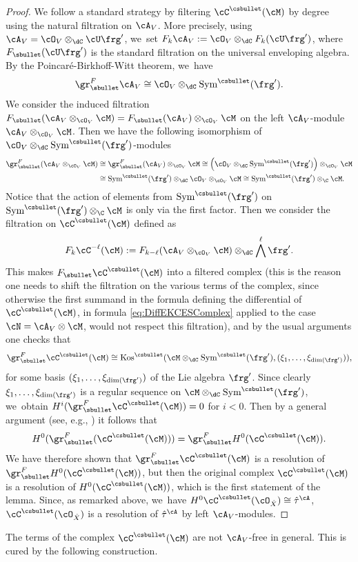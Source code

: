 \begin{proof}
We follow a standard strategy by filtering
$\cC^{\csbullet}(\cM)$ by degree using the natural
filtration on $\cA_V$. More precisely, using
$\cA_V=\cO_V\otimes_\dC\cU\frg'$, we~set $F_k\cA_V:=\cO_V\otimes_\dC F_k(\cU\frg')$, where $F_\sbullet(\cU\frg')$ is the standard filtration on the universal enveloping algebra. By the Poincaré-Birkhoff-Witt theorem, we~have
\[
\gr^F_\sbullet \cA_V \cong \cO_V\otimes_\dC \textup{Sym}^{\csbullet}(\frg').
\]
We consider the induced filtration
$F_\sbullet(\cA_V \otimes_{\cO_V} \cM) = F_\sbullet(\cA_V) \otimes_{\cO_V} \cM$ on the left $\cA_V$\nobreakdash-mod\-ule
$\cA_V \otimes_{\cO_V} \cM$. Then we have the following isomorphism of $\cO_V\otimes_\dC \textup{Sym}^{\csbullet}(\frg')$\nobreakdash-mod\-ules
\begin{align*}
\gr^F_\sbullet(\cA_V \otimes_{\cO_V} \cM) &\cong \gr^F_\sbullet(\cA_V) \otimes_{\cO_V} \cM
\cong
\left(\cO_V\otimes_\dC \textup{Sym}^{\csbullet}(\frg')\right) \otimes_{\cO_V} \cM
\\ &\cong
\textup{Sym}^{\csbullet}(\frg') \otimes_{\dC} \cO_V \otimes_{\cO_V} \cM
\cong
\textup{Sym}^{\csbullet}(\frg') \otimes_{\C} \cM.
\end{align*}
Notice that the action of elements from $\textup{Sym}^{\csbullet}(\frg')$ on
$\textup{Sym}^{\csbullet}(\frg') \otimes_{\C} \cM$ is only via the first factor.
Then we consider the filtration on $\cC^{\csbullet}(\cM)$ defined as
\[
F_k \cC^{-\ell}(\cM) :=
F_{k-\ell}(\cA_V \otimes_{\cO_V} \cM) \otimes_\dC \bigwedge^\ell \frg'.
\]
This makes $F_\sbullet\cC^{\csbullet}(\cM)$ into a filtered complex (this is the reason one needs to shift the filtration on the various terms of the complex, since otherwise the first summand in the formula defining the differential of $\cC^{\csbullet}(\cM)$, \ie in formula \eqref{eq:DiffEKCESComplex} applied to the case $\cN=\cA_V\otimes \cM$, would not respect this filtration), and by the usual arguments one checks that
\[
\gr^F_\sbullet \cC^{\csbullet}(\cM)
\cong \textup{Kos}^{\csbullet}(\cM \otimes_\dC \textup{Sym}^{\csbullet}(\frg'), (\xi_1,\ldots,\xi_{\dim(\frg')})),
\]
for some basis $(\xi_1,\ldots,\xi_{\dim(\frg')})$ of the Lie algebra $\frg'$. Since clearly
$\xi_1,\ldots,\xi_{\dim(\frg')}$ is a regular sequence on $\cM\otimes_\dC \textup{Sym}^{\csbullet}(\frg')$, we~obtain $H^i(\gr_\sbullet^F \cC^{\csbullet}(\cM)) = 0$ for $i<0$. Then by a general argument (see, e.g., \cite[Th.\,4.3.5]{SST}) it follows that
\[
H^0(\gr^F_\sbullet(\cC^{\csbullet}(\cM)))=\gr^F_\sbullet H^0(\cC^{\csbullet}(\cM)).
\]
We have therefore shown that $\gr^F_\sbullet \cC^{\csbullet}(\cM)$ is a resolution of
$\gr^F_\sbullet H^0(\cC^{\csbullet}(\cM))$, but then
the original complex $\cC^{\csbullet}(\cM)$ is a resolution of $H^0(\cC^{\csbullet}(\cM))$, which is the first statement of the lemma.
Since, as remarked above, we~have
$H^0\cC^{\csbullet}(\cO_{\hat{X}}) \cong \hat\tau^\cA$,
$\cC^{\csbullet}(\cO_{\hat{X}})$ is a resolution of
$\hat\tau^\cA$
by left $\cA_V$\nobreakdash-mod\-ules.
\end{proof}
The terms of the complex $\cC^{\csbullet}(\cM)$ are not $\cA_V$-free in general. This is cured by the following construction.

